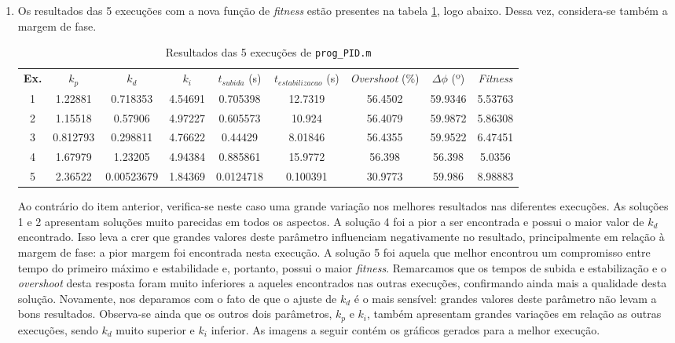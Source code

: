\begin {enumerate}
	\FloatBarrier
	
	\item Os resultados das 5 execuções com a nova função de \textit{fitness} estão
	presentes na tabela \ref{tab:pid_d}, logo abaixo. Dessa vez, considera-se
	também a margem de fase.
	
	\FloatBarrier
	
	\begin{table}[h]
	    \centering
		\caption{\label{tab:pid_d} Resultados das 5 execuções de
		\texttt{prog\_PID.m}}
		\vspace{-12pt}	
		\begin{tabular}{| c | c | c | c | c | c | c | c | c |}
			\hline
			\textbf{Ex.} & \(k_p\) & \(k_d\) & \(k_i\) &
			\(t_{subida} \) (s) & \(t_{estabilizacao}\) (s) & \textit{Overshoot} (\%) &
			\(\Delta \phi\) (º)& \textit{Fitness}\\ \hhline{|=|=|=|=|=|=|=|=|=|}
			1 & 1.22881 & 0.718353 & 4.54691 & 0.705398 & 12.7319 &  56.4502  &
			59.9346 & 5.53763\\ \hline 
			2 & 1.15518 & 0.57906 & 4.97227 & 0.605573 & 10.924 & 56.4079  & 
			59.9872 & 5.86308 \\
			\hline 3 & 0.812793 & 0.298811 & 4.76622 & 0.44429  & 8.01846 & 56.4355 &
			59.9522 & 6.47451	\\
			\hline 4 & 1.67979 & 1.23205 & 4.94384 & 0.885861 & 15.9772 & 56.398  &
			56.398  & 5.0356 \\
			\hline 5 & 2.36522 & 0.00523679 & 1.84369 & 0.0124718 & 0.100391 & 30.9773 &
			59.986 & 8.98883 \\ 
			\hline
		\end{tabular}	    
    \end{table}
    
    \FloatBarrier
    
    Ao contrário do item anterior, verifica-se neste caso uma grande variação
    nos melhores resultados nas diferentes execuções. As soluções 1 e 2
    apresentam soluções muito parecidas em todos os aspectos. A solução 4 foi a
    pior a ser encontrada e possui o maior valor de \(k_d\) encontrado. Isso
    leva a crer que grandes valores deste parâmetro influenciam negativamente no
    resultado, principalmente em relação à margem de fase: a pior margem foi
    encontrada nesta execução. A solução 5 foi aquela que melhor encontrou um
    compromisso entre tempo do primeiro máximo e estabilidade e, portanto,
    possui o maior \textit{fitness}. Remarcamos que os tempos de subida e
    estabilização e o \textit{overshoot} desta resposta foram muito inferiores a
    aqueles encontrados nas outras execuções, confirmando ainda mais a qualidade
    desta solução. Novamente, nos deparamos com o fato de que o ajuste de \(k_d\) é o
    mais sensível: grandes valores deste parâmetro não levam a bons resultados.
    Observa-se ainda que os outros dois parâmetros, \(k_p\) e \(k_i\), também
    apresentam grandes variações em relação as outras execuções, sendo \(k_d\)
    muito superior e \(k_i\) inferior. As imagens a seguir contém os gráficos
    gerados para a melhor execução. 
    

\end{enumerate}
